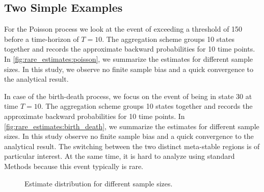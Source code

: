 \subsection{Two Simple Examples}
For the Poisson process we look at the event of exceeding a threshold
of \num{150} before a time-horizon of $T=10$.
The aggregation scheme groups \num{10} states together and records
the approximate backward probabilities for \num{10} time points.
In \autoref{fig:rare_estimates:poisson}, we summarize the estimates
for different sample sizes.
In this study, we observe no finite sample bias and a quick
convergence to the analytical result.

In case of the birth-death process, we focus on the event of being in
state \num{30} at time $T=10$.
The aggregation scheme groups \num{10} states together and records
the approximate backward probabilities for \num{10} time points.
In \autoref{fig:rare_estimates:birth_death}, we summarize the
estimates for different sample sizes.
In this study observe no finite sample bias and a quick convergence
to the analytical result.
The switching between the two distinct meta-stable regions is of
particular interest.
At the same time, it is hard to analyze using standard Methods
because this event typically is rare.
\begin{figure}[htb]
  \centering
  \caption[Estimates for different sample
  sizes]{\label{fig:rare_estimates}Estimate distribution for
  different sample sizes.}
\end{figure}
